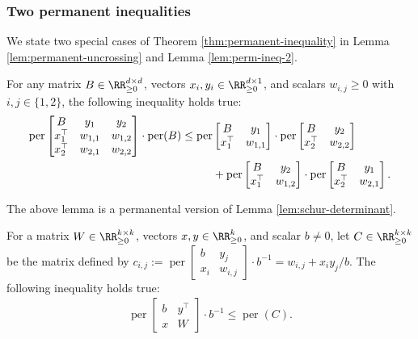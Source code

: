 \documentclass[11pt]{article}
\theoremstyle{definition}
\DeclareMathOperator{\per}{per}
\begin{document}
\subsubsection{Two permanent inequalities}
We state two special cases of Theorem \ref{thm:permanent-inequality} in Lemma \ref{lem:permanent-uncrossing} and Lemma \ref{lem:perm-ineq-2}.

\begin{lemma}
	\label{lem:permanent-uncrossing}
   For any matrix $B\in \RR^{d\times d}_{\geq 0}$, vectors $x_i,y_i \in \RR^{d\times 1}_{\geq 0}$, and scalars $w_{i,j}\geq 0$ with $i,j \in \{1,2\}$, the following inequality holds true:
	\begin{align}
		\label{eqn:ineq-1}
		\per\begin{bmatrix}
			B & y_1 & y_2 \\
			x_1^{\top}& w_{1,1} & w_{1,2}\\
			x_2^{\top}& w_{2,1} & w_{2,2}
		\end{bmatrix}\cdot \per(B)\leq \per&\begin{bmatrix}
			B & y_1 \\
			x_1^{\top}& w_{1,1}
		\end{bmatrix}  \cdot\per\begin{bmatrix}
			B & y_2 \\
			x_2^{\top}& w_{2,2}
		\end{bmatrix}\notag \\
        &+ \per\begin{bmatrix}
			B & y_2 \\
			x_1^{\top}& w_{1,2}
		\end{bmatrix}\cdot\per\begin{bmatrix}
			B & y_1 \\
			x_2^{\top}& w_{2,1}
		\end{bmatrix}.
	\end{align}	
\end{lemma}
The above lemma is a permanental version of Lemma \ref{lem:schur-determinant}.
\begin{lemma} \label{lem:perm-ineq-2}
	For a matrix $W\in \RR^{k\times k}_{\geq 0}$, vectors $x,y\in \RR^k_{\geq 0}$, and scalar $b\neq 0$, let $C\in \RR^{k\times k}_{\geq 0}$ be the matrix defined by $c_{i,j}:= \per\begin{bmatrix}
		b & y_j\\
		x_i& w_{i,j}
	\end{bmatrix}\cdot b^{-1}=w_{i,j}+x_iy_j/b$. The following inequality holds true:
	\begin{align}
		\label{eqn:ineq-2}
		\per\begin{bmatrix}
			b & y^{\top} \\
			x & W 
		\end{bmatrix}\cdot b^{-1} \leq \per(C).
	\end{align}
\end{lemma}
\end{document}
